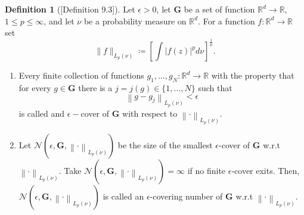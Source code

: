 \documentclass[a4paper]{article}
\theoremstyle{definition}
\newtheorem{definition}{Definition}
\theoremstyle{remark}
\theoremstyle{plain}
\newcommand{\bG}{\mathbf{G}}
\newcommand{\cN}{\mathcal{N}}
\newcommand{\R}{\mathbb{R}}
\begin{document}
\begin{definition}[{\normalfont\citet{gyorfi2002distribution}[Definition 9.3]}]
    Let $\epsilon > 0$, let $\bG$ be a set of function $\R^d \to \R$, $1 \leq p \leq \infty$, and let $\nu$ be a probability measure on $\R^d$. For a function $f: \R^d \to \R$ set
    \begin{equation*}
        \lVert f \rVert_{L_p(\nu)} \coloneq \left[\int |f(z)|^pd\nu\right]^\frac{1}{p}.
    \end{equation*}
    \begin{enumerate}[label=(\alph*)]
        \item Every finite collection of functions $g_1, \dots, g_N: \R^d \to \R$ with the property that for every $g \in \bG$ there is a $j = j(g) \in \{1, \dots, N\}$ such that 
        \begin{equation*}
            \left\lVert g - g_j \right\rVert_{L_p(\nu)} < \epsilon
        \end{equation*}
        is called and $\epsilon-$cover of $\bG$ with respect to $\left\lVert \cdot \right\rVert_{L_p(\nu)}$.
        
        \item Let $\cN\left(\epsilon, \bG, \left\lVert \cdot \right\rVert_{L_p(\nu)} \right)$ be the size of the smallest $\epsilon$-cover of $\bG$ w.r.t $\left\lVert \cdot \right\rVert_{L_p(\nu)}$. Take $\cN\left(\epsilon, \bG, \left\lVert \cdot \right\rVert_{L_p(\nu)} \right) = \infty$ if no finite $\epsilon$-cover exits. Then, $\cN\left(\epsilon, \bG, \left\lVert \cdot \right\rVert_{L_p(\nu)} \right)$ is called an $\epsilon$-covering number of $\bG$ w.r.t $\left\lVert \cdot \right\rVert_{L_p(\nu)}$. 


\end{enumerate}
\end{definition}
\end{document}
